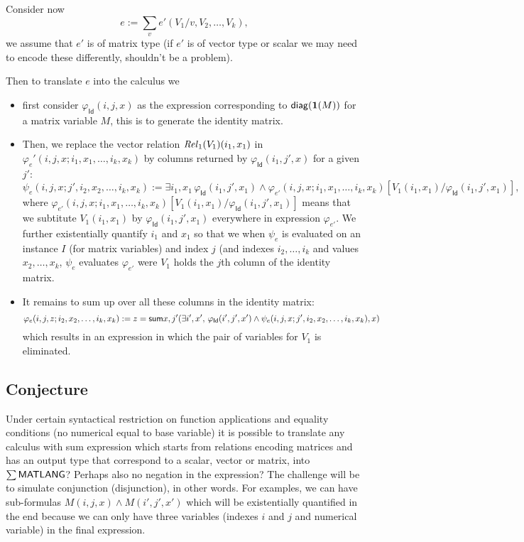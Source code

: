 Consider now $$
e:=\sum_v e'(V_1/v,V_2,\ldots,V_k),
$$ 
we assume that $e'$ is of matrix type (if $e'$ is of vector type or scalar we may need to encode these differently, shouldn't be a problem).

Then to translate  $e$  into the calculus we 
\begin{itemize}
\item first consider $\varphi_{\mathsf{Id}}(i,j,x)$ as the expression corresponding to $\mathsf{diag}(\mathbf{1}(M))$ for a matrix variable $M$, this is to generate the identity matrix.
\item
Then, we replace the vector relation  $\mathit{Rel}_1(V_1)(i_1,x_1)$ in $\varphi_e'(i,j,x; i_1,x_1,\ldots,i_k,x_k)$ by columns returned by $\varphi_{\mathsf{Id}}(i_1,j',x)$ for a given $j'$:
$$
\psi_e(i,j,x;j',i_2,x_2,\ldots,i_k,x_k):=\exists i_1,x_1\, \varphi_{\mathsf{Id}}(i_1,j',x_1)\land      \varphi_{e'}(i,j,x; i_1,x_1,\ldots,i_k,x_k)[V_1(i_1,x_1)/\varphi_{\mathsf{Id}}(i_1,j',x_1)],
$$
where $\varphi_{e'}(i,j,x; i_1,x_1,\ldots,i_k,x_k)[V_1(i_1,x_1)/\varphi_{\mathsf{Id}}(i_1,j',x_1)]$ means that we subtitute $V_1(i_1,x_1)$ by 
$\varphi_{\mathsf{Id}}(i_1,j',x_1)$ everywhere in expression $\varphi_{e'}$. We further existentially quantify $i_1$ and $x_1$ so that we
when $\psi_e$ is evaluated on an instance $I$ (for matrix variables) and index $j$ (and indexes $i_2,\ldots,i_k$ and values $x_2,\ldots,x_k$,
$\psi_e$ evaluates $\varphi_{e'}$ were $V_1$ holds the $j$th column of the identity matrix.
\item It remains to sum up over all these columns in the identity matrix:
$$
\varphi_e(i,j,z;i_2,x_2,\ldots,i_k,x_k):= z= \mathsf{sum} x,j' (\exists i',x',\, \varphi_{\mathsf{Id}}(i',j',x')\land \psi_e(i,j,x;j',i_2,x_2,\ldots,i_k,x_k),x)
$$
which results in an expression in which the pair of variables for $V_1$ is eliminated.
\end{itemize}

\subsection{Conjecture}
Under certain syntactical restriction on function applications and equality conditions (no numerical equal to base variable) it is possible to
translate any calculus with sum expression which starts from relations encoding matrices and has an output type that correspond to a scalar,
vector or matrix, into $\sum\mathsf{MATLANG}$? Perhaps also no  negation in the expression? The challenge will be to simulate conjunction (disjunction), in other words. For examples, we can have sub-formulas $M(i,j,x)\land M(i',j',x')$ which will be existentially quantified in the end because we can only have 
three variables (indexes $i$ and $j$ and numerical variable) in the final expression. 

